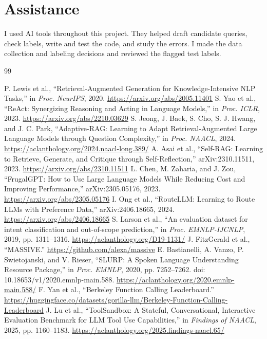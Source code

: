 \documentclass[conference]{IEEEtran}
\begin{document}
\section*{Assistance}
I used AI tools throughout this project. They helped draft candidate queries, check labels, write and test the code, and study the errors. I made the data collection and labeling decisions and reviewed the flagged test labels.

\balance
\begin{thebibliography}{99}
\raggedright
{} P. Lewis et al., ``Retrieval-Augmented Generation for Knowledge-Intensive NLP Tasks,'' in \emph{Proc. NeurIPS}, 2020. \url{https://arxiv.org/abs/2005.11401}
 S. Yao et al., ``ReAct: Synergizing Reasoning and Acting in Language Models,'' in \emph{Proc. ICLR}, 2023. \url{https://arxiv.org/abs/2210.03629}
 S. Jeong, J. Baek, S. Cho, S. J. Hwang, and J. C. Park, ``Adaptive-RAG: Learning to Adapt Retrieval-Augmented Large Language Models through Question Complexity,'' in \emph{Proc. NAACL}, 2024. \url{https://aclanthology.org/2024.naacl-long.389/}
 A. Asai et al., ``Self-RAG: Learning to Retrieve, Generate, and Critique through Self-Reflection,'' arXiv:2310.11511, 2023. \url{https://arxiv.org/abs/2310.11511}
 L. Chen, M. Zaharia, and J. Zou, ``FrugalGPT: How to Use Large Language Models While Reducing Cost and Improving Performance,'' arXiv:2305.05176, 2023. \url{https://arxiv.org/abs/2305.05176}
 I. Ong et al., ``RouteLLM: Learning to Route LLMs with Preference Data,'' arXiv:2406.18665, 2024. \url{https://arxiv.org/abs/2406.18665}
 S. Larson et al., ``An evaluation dataset for intent classification and out-of-scope prediction,'' in \emph{Proc. EMNLP-IJCNLP}, 2019, pp. 1311--1316. \url{https://aclanthology.org/D19-1131/}
 J. FitzGerald et al., ``MASSIVE.'' \url{https://github.com/alexa/massive}
 E. Bastianelli, A. Vanzo, P. Swietojanski, and V. Rieser, ``SLURP: A Spoken Language Understanding Resource Package,'' in \emph{Proc. EMNLP}, 2020, pp. 7252--7262. doi: 10.18653/v1/2020.emnlp-main.588. \url{https://aclanthology.org/2020.emnlp-main.588/}
 F. Yan et al., ``Berkeley Function Calling Leaderboard.'' \url{https://huggingface.co/datasets/gorilla-llm/Berkeley-Function-Calling-Leaderboard}
 J. Lu et al., ``ToolSandbox: A Stateful, Conversational, Interactive Evaluation Benchmark for LLM Tool Use Capabilities,'' in \emph{Findings of NAACL}, 2025, pp. 1160--1183. \url{https://aclanthology.org/2025.findings-naacl.65/}

\end{thebibliography}
\end{document}
